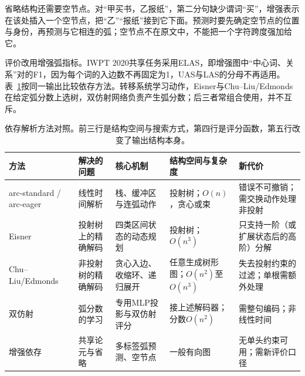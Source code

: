 省略结构还需要空节点。对“甲买书，乙报纸”，第二分句缺少谓词“买”，增强表示在该处插入一个空节点，把“乙”“报纸”接到它下面。预测时要先确定空节点的位置与身份，再预测与它相连的弧；空节点不在原文中，不能把一个字符跨度强加给它。

评价改用增强弧指标。IWPT 2020共享任务采用ELAS，即增强图中“中心词、关系”对的F1，因为每个词的入边数不再固定为1，UAS与LAS的分母不再适用。表~\ref{tab:nlp-analysis-dependency-methods}按同一输出比较依存方法。转移系统学习动作，Eisner与Chu--Liu/Edmonds在给定弧分数上选树，双仿射网络负责产生弧分数；后三者常组合使用，并不互斥。

\begin{table}[htbp]
  \centering
  \begin{tabularx}{\linewidth}{@{}l XXXX@{}}
    \toprule
    方法&解决的问题&核心机制&结构空间与复杂度&新代价\\
    \midrule
    arc-standard / arc-eager&线性时间解析&栈、缓冲区与连弧动作&投射树；$O(n)$，贪心或束&错误不可撤销；需交换动作处理非投射\\
    Eisner&投射树上的精确解码&四类区间状态的动态规划&投射树；$O(n^3)$&只支持一阶（或扩展状态后的高阶）分解\\
    Chu--Liu/Edmonds&非投射树的精确解码&贪心入边、收缩环、递归展开&任意生成树形图；$O(n^2)$至$O(n^3)$&失去投射约束的过滤；单根需额外处理\\
    双仿射&弧分数的学习&专用MLP投影与双仿射评分&接上述解码器；分数$O(n^2)$&需整句编码；非线性时间\\
    增强依存&共享论元与省略&多标签弧预测、空节点&一般有向图&无单头约束可用；需新评价口径\\
    \bottomrule
  \end{tabularx}
  \caption{依存解析方法对照。前三行是结构空间与搜索方式，第四行是评分函数，第五行改变了输出结构本身。}
  \label{tab:nlp-analysis-dependency-methods}
\end{table}
